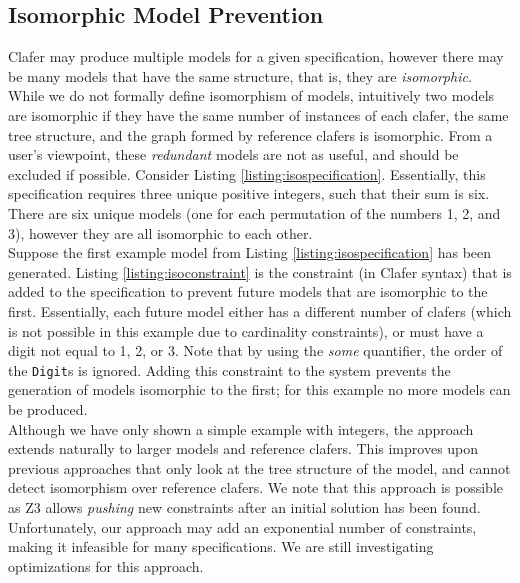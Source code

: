 \documentclass{easychair}
\begin{document}
\subsection{Isomorphic Model Prevention}
\label{isomorphism}
Clafer may produce multiple models for a given specification, however there may be many models that have the same structure, that is, they are \textit{isomorphic}. While we do not formally define isomorphism of models, intuitively two models are isomorphic if they have the same number of instances of each clafer, the same tree structure, and the graph formed by reference clafers is isomorphic. From a user's viewpoint,  these \textit{redundant} models are not as useful, and should be excluded if possible. Consider Listing \ref{listing:isospecification}. Essentially, this specification requires three unique positive integers, such that their sum is six. There are six unique models (one for each permutation of the numbers 1, 2, and 3), however they are all isomorphic to each other. \\
\indent Suppose the first example model from Listing \ref{listing:isospecification} has been generated. Listing \ref{listing:isoconstraint} is the constraint (in Clafer syntax) that is added to the specification to prevent future models that are isomorphic to the first. Essentially, each future model either has a different number of clafers (which is not possible in this example due to cardinality constraints), or must have a digit not equal to 1, 2, or 3. Note that by using the \textit{some} quantifier, the order of the \texttt{Digit}s is ignored. Adding this constraint to the system prevents the generation of models isomorphic to the first; for this example no more models can be produced. \\
\indent Although we have only shown a simple example with integers, the approach extends naturally to larger models and reference clafers. This improves upon previous approaches that only look at the tree structure of the model, and cannot detect isomorphism over reference clafers. We note that this approach is possible as Z3 allows \textit{pushing} new constraints after an initial solution has been found. Unfortunately, our approach may add an exponential number of constraints, making it infeasible for many specifications. We are still investigating optimizations for this approach.
\end{document}
